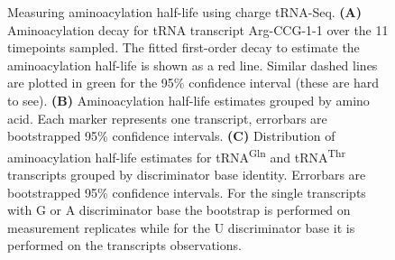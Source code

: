 \documentclass[9pt,lineno]{elife}
\begin{document}
\begin{figure}[ht!]
\centering
{}
\caption{
Measuring aminoacylation half-life using charge tRNA-Seq.
\textbf{(A)} Aminoacylation decay for tRNA transcript Arg-CCG-1-1 over the 11 timepoints sampled.
The fitted first-order decay to estimate the aminoacylation half-life is shown as a red line.
Similar dashed lines are plotted in green for the 95\% confidence interval (these are hard to see).
\textbf{(B)} Aminoacylation half-life estimates grouped by amino acid.
Each marker represents one transcript, errorbars are bootstrapped 95\% confidence intervals.
\textbf{(C)} Distribution of aminoacylation half-life estimates for tRNA\textsuperscript{Gln} and tRNA\textsuperscript{Thr} transcripts grouped by discriminator base identity.
Errorbars are bootstrapped 95\% confidence intervals.
For the single transcripts with G or A discriminator base the bootstrap is performed on measurement replicates while for the U discriminator base it is performed on the transcripts observations.
}
\label{fig:Fig6}

\label{figsupp:f6S1}
\end{figure}
\end{document}
